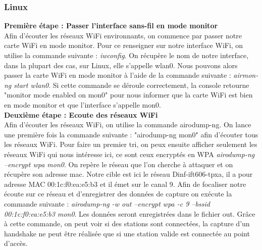 \documentclass[11pt]{article}
\begin{document}
\subsubsection{Linux}
\textbf{Première étape : Passer l'interface sans-fil en mode monitor}~\\
Afin d'écouter les réseaux WiFi environnants, on commence par passer notre carte WiFi en mode monitor. Pour ce renseigner sur notre interface WiFi, on utilise la commande suivante : \textit{iwconfig}. On récupère le nom de notre interface, dans la plupart des cas, sur Linux, elle s'appelle wlan0. Nous pouvons alors passer la carte WiFi en mode monitor à l'aide de la commande suivante : \textit{airmon-ng start wlan0}. Si cette commande se déroule correctement, la console retourne "monitor mode enabled on mon0" pour nous informer que la carte WiFi est bien en mode monitor et que l'interface s'appelle mon0.~\\

\textbf{Deuxième étape : Ecoute des réseaux WiFi}~\\
Afin d'écouter les réseaux WiFi, on utilise la commande airodump-ng. On lance une première fois la commande suivante : "airodump-ng mon0" afin d'écouter tous les réseaux WiFi. Pour faire un premier tri, on peux ensuite afficher seulement les réseaux WiFi qui nous intéresse ici, ce sont ceux encryptés en WPA \textit{airodump-ng --encrypt wpa mon0}. On repère le réseau que l'on cherche à attaquer et on récupère son adresse mac. Notre cible est ici le réseau Dinf-ift606-tpxa, il a pour adresse MAC 00:1c:f0:ea:e5:b3 et il émet sur le canal 9. Afin de focaliser notre écoute sur ce réseau et d'enregistrer des données de capture on exécute la commande suivante : \textit{airodump-ng -w out --encrypt wpa -c 9 --bssid 00:1c:f0:ea:e5:b3 mon0}. Les données seront enregistrées dans le fichier out. Grâce à cette commande, on peut voir si des stations sont connectées, la capture d'un handshake ne peut être réalisée que si une station valide est connectée au point d'accès.~\\
\end{document}
